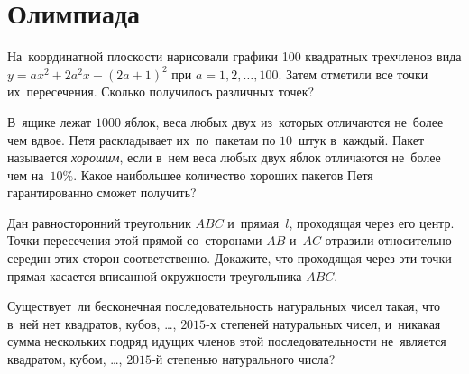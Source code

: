 

\section*{Олимпиада}


\begin{problems}

\item
На~координатной плоскости нарисовали графики 100 квадратных трехчленов вида
$y = a x^2 + 2 a^2 x - (2 a + 1)^2$ при $a = 1, 2, \ldots, 100$.
Затем отметили все точки их~пересечения.
Сколько получилось различных точек?

\item
В~ящике лежат $1000$ яблок, веса любых двух из~которых отличаются не~более чем
вдвое.
Петя раскладывает их~по~пакетам по $10$~штук в~каждый.
Пакет называется \emph{хорошим}, если в~нем веса любых двух яблок отличаются
не~более чем на~$10\%$.
Какое наибольшее количество хороших пакетов Петя гарантированно сможет
получить?

\item
Дан равносторонний треугольник $ABC$ и~прямая~$l$, проходящая через его центр.
Точки пересечения этой прямой со~сторонами $AB$ и~$AC$ отразили относительно
середин этих сторон соответственно.
Докажите, что проходящая через эти точки прямая касается вписанной окружности
треугольника $ABC$.

\item
Существует~ли бесконечная последовательность натуральных чисел такая, что в~ней
нет квадратов, кубов, \ldots, $2015$-х степеней натуральных чисел, и~никакая
сумма нескольких подряд идущих членов этой последовательности не~является
квадратом, кубом, \ldots, $2015$-й степенью натурального числа?

\end{problems}

